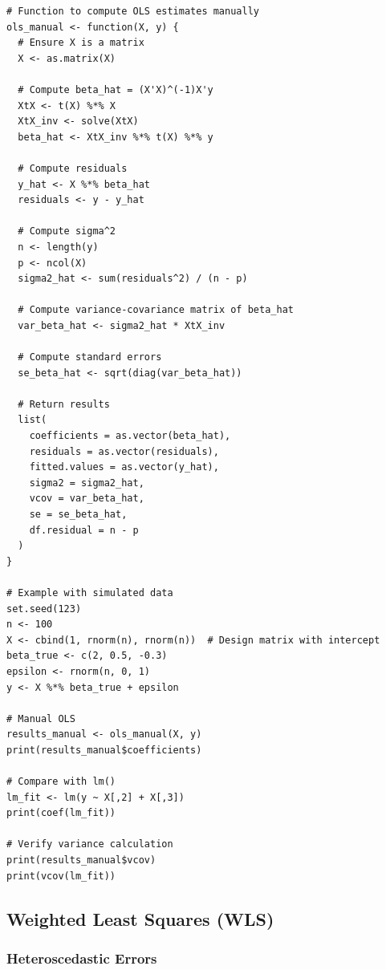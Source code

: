 \documentclass{article}
\begin{document}
\begin{lstlisting}[caption={R Implementation: OLS Estimation}]
# Function to compute OLS estimates manually
ols_manual <- function(X, y) {
  # Ensure X is a matrix
  X <- as.matrix(X)
  
  # Compute beta_hat = (X'X)^(-1)X'y
  XtX <- t(X) %*% X
  XtX_inv <- solve(XtX)
  beta_hat <- XtX_inv %*% t(X) %*% y
  
  # Compute residuals
  y_hat <- X %*% beta_hat
  residuals <- y - y_hat
  
  # Compute sigma^2
  n <- length(y)
  p <- ncol(X)
  sigma2_hat <- sum(residuals^2) / (n - p)
  
  # Compute variance-covariance matrix of beta_hat
  var_beta_hat <- sigma2_hat * XtX_inv
  
  # Compute standard errors
  se_beta_hat <- sqrt(diag(var_beta_hat))
  
  # Return results
  list(
    coefficients = as.vector(beta_hat),
    residuals = as.vector(residuals),
    fitted.values = as.vector(y_hat),
    sigma2 = sigma2_hat,
    vcov = var_beta_hat,
    se = se_beta_hat,
    df.residual = n - p
  )
}

# Example with simulated data
set.seed(123)
n <- 100
X <- cbind(1, rnorm(n), rnorm(n))  # Design matrix with intercept
beta_true <- c(2, 0.5, -0.3)
epsilon <- rnorm(n, 0, 1)
y <- X %*% beta_true + epsilon

# Manual OLS
results_manual <- ols_manual(X, y)
print(results_manual$coefficients)

# Compare with lm()
lm_fit <- lm(y ~ X[,2] + X[,3])
print(coef(lm_fit))

# Verify variance calculation
print(results_manual$vcov)
print(vcov(lm_fit))
\end{lstlisting}








\subsection{Weighted Least Squares (WLS)}

\subsubsection{Heteroscedastic Errors}
\end{document}
